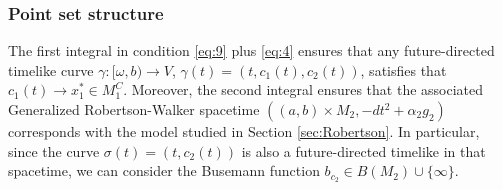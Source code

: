 %
%
%

\subsubsection{Point set structure}

The first integral in condition \eqref{eq:9} plus \eqref{eq:4} ensures that any future-directed timelike curve $\gamma:[\omega,b)\rightarrow V$,  $\gamma(t)=(t,c_1(t),c_2(t))$, satisfies that $c_1(t)\rightarrow x_1^*\in M_1^C$. Moreover, the second integral ensures that the associated Generalized Robertson-Walker spacetime $((a,b) \times M_2,-dt^2+\alpha_2g_2)$ corresponds with the model studied in Section \ref{sec:Robertson}. In particular, since the curve $\sigma(t)=(t,c_2(t))$ is also a future-directed timelike in that spacetime, we can consider the Busemann function $b_{c_2}\in B(M_2)\cup \{\infty\}$.

